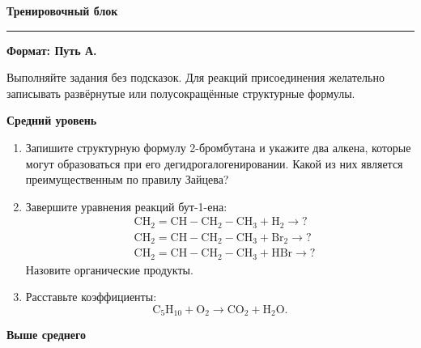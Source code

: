 \documentclass[a4paper,12pt]{article}
\newcommand{\topic}[1]{%
    \vspace{0.5em}
    {\Large\bfseries\textcolor{darkaccent}{#1}}\par
    \vspace{0.25em}
    {\color{accent}\rule{\linewidth}{0.7pt}}
    \vspace{0.4em}
}
\newcommand{\subtopic}[1]{%
    \vspace{0.35em}
    {\large\bfseries\textcolor{accent}{#1}}\par
}
\begin{document}

\clearpage
\thispagestyle{fancy}

\topic{Тренировочный блок}

\textbf{Формат: Путь А.}

Выполняйте задания без подсказок. Для реакций присоединения желательно записывать развёрнутые или полусокращённые структурные формулы.

\subtopic{Средний уровень}

\begin{enumerate}

\item Запишите структурную формулу 2-бромбутана и укажите два алкена, которые могут образоваться при его дегидрогалогенировании. Какой из них является преимущественным по правилу Зайцева?

\item Завершите уравнения реакций бут-1-ена:
\[
\begin{aligned}
&\mathrm{CH_2=CH-CH_2-CH_3+H_2}
\longrightarrow ?\\
&\mathrm{CH_2=CH-CH_2-CH_3+Br_2}
\longrightarrow ?\\
&\mathrm{CH_2=CH-CH_2-CH_3+HBr}
\longrightarrow ?
\end{aligned}
\]
Назовите органические продукты.

\item Расставьте коэффициенты:
\[
\mathrm{C_5H_{10}+O_2\longrightarrow CO_2+H_2O}.
\]

\end{enumerate}

\subtopic{Выше среднего}
\end{document}
